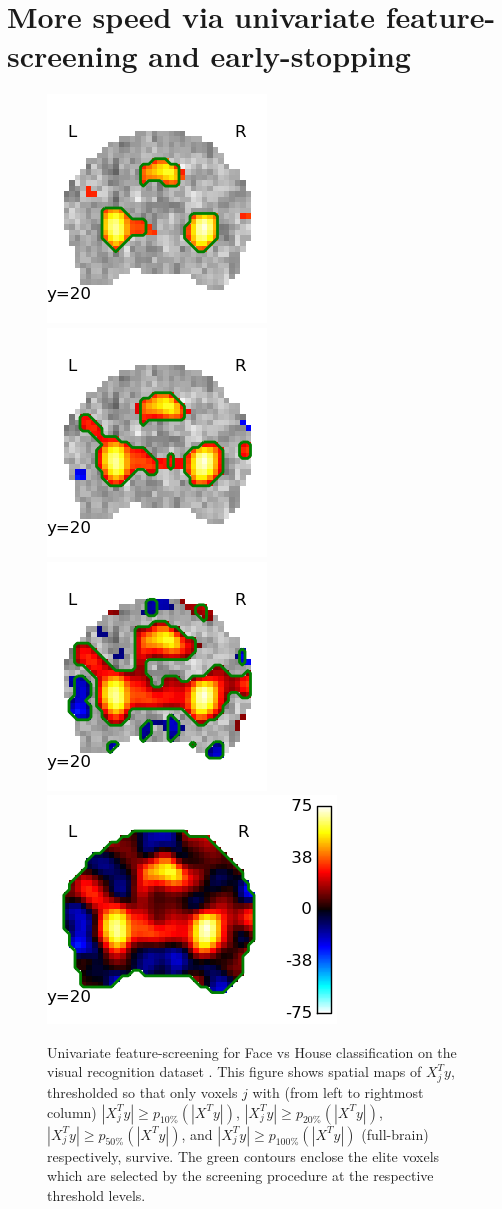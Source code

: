   \section{More speed via univariate feature-screening and early-stopping}
 \begin{figure}[!htb]
  \includegraphics[width=.24\linewidth]{figures/poldrack_demo_sp10.png}
  \hspace{-1em}
  \includegraphics[width=.24\linewidth]{figures/poldrack_demo_sp20.png}
  \hspace{-1em}
  \includegraphics[width=.24\linewidth]{figures/poldrack_demo_sp50.png}
  \hspace{-1em}
  \includegraphics[width=.31\linewidth]{figures/poldrack_demo_sp100.png}
\caption{Univariate feature-screening for Face vs House
  classification on the visual recognition dataset  \citep{jimura2012}.
  This figure shows spatial maps of
  $X^T_jy$, thresholded so that only voxels $j$ with (from left to
  rightmost column)  $|X^T_jy| \ge p_{10\%}(|X^Ty|)$, $|X^T_jy| \ge
  p_{20\%}(|X^Ty|)$, $|X^T_jy| \ge p_{50\%}(|X^Ty|)$, and $|X^T_jy|
  \ge p_{100\%}(|X^Ty|)$ (full-brain) respectively, survive. The
  green contours enclose the elite voxels which are selected by the
  screening procedure at the respective threshold
  levels.}
\label{Fig:potato}
\end{figure}
